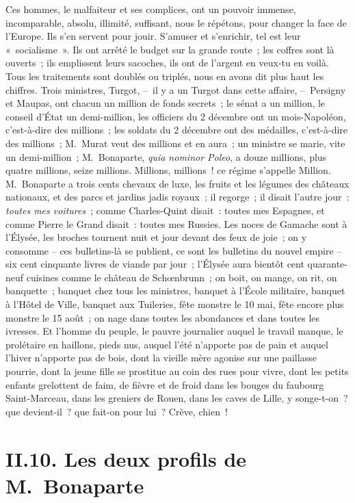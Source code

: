 \documentclass[french,twoside]{book} %
\begin{document}
Ces hommes, le malfaiteur et ses complices, ont un pouvoir immense, incomparable, absolu, illimité, suffisant, nous le répétons, pour changer la face de l’Europe. Ils s’en servent pour jouir. S’amuser et s’enrichir, tel est leur « socialisme ». Ils ont arrêté le budget sur la grande route ; les coffres sont là ouverts ; ils emplissent leurs sacoches, ils ont de l’argent en veux-tu en voilà. Tous les traitements sont doublés ou triplés, nous en avons dit plus haut les chiffres. Trois ministres, Turgot, – il y a un Turgot dans cette affaire, – Persigny et Maupas, ont chacun un million de fonds secrets ; le sénat a un million, le conseil d’État un demi-million, les officiers du 2 décembre ont un mois-Napoléon, c’est-à-dire des millions ; les soldats du 2 décembre ont des médailles, c’est-à-dire des millions ; M. Murat veut des millions et en aura ; un ministre se marie, vite un demi-million ; M. Bonaparte, \emph{quia nominor Poleo}, a douze millions, plus quatre millions, seize millions. Millions, millions ! ce régime s’appelle Million. M. Bonaparte a trois cents chevaux de luxe, les fruits et les légumes des châteaux nationaux, et des parcs et jardins jadis royaux ; il regorge ; il disait l’autre jour : \emph{toutes mes voitures} ; comme Charles-Quint disait : toutes mes Espagnes, et comme Pierre le Grand disait : toutes mes Russies. Les noces de Gamache sont à l’Élysée, les broches tournent nuit et jour devant des feux de joie ; on y consomme – ces bulletins-là se publient, ce sont les bulletins du nouvel empire – six cent cinquante livres de viande par jour ; l’Élysée aura bientôt cent quarante-neuf cuisines comme le château de Schœnbrunn ; on boit, on mange, on rit, on banquette ; banquet chez tous les ministres, banquet à l’École militaire, banquet à l’Hôtel de Ville, banquet aux Tuileries, fête monstre le 10 mai, fête encore plus monstre le 15 août ; on nage dans toutes les abondances et dans toutes les ivresses. Et l’homme du peuple, le pauvre journalier auquel le travail manque, le prolétaire en haillons, pieds nus, auquel l’été n’apporte pas de pain et auquel l’hiver n’apporte pas de bois, dont la vieille mère agonise sur une paillasse pourrie, dont la jeune fille se prostitue au coin des rues pour vivre, dont les petits enfants grelottent de faim, de fièvre et de froid dans les bouges du faubourg Saint-Marceau, dans les greniers de Rouen, dans les caves de Lille, y songe-t-on ? que devient-il ? que fait-on pour lui ? Crève, chien !

\section[{II.10. Les deux profils de M. Bonaparte}]{II.10. Les deux profils de M. Bonaparte}
\end{document}
